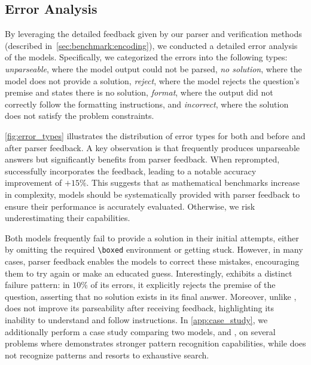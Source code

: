 
\subsection{Error Analysis} \label{sec:error_analysis}

By leveraging the detailed feedback given by our parser and verification methods (described in~\cref{sec:benchmark:encoding}), we conducted a detailed error analysis of the models. Specifically, we categorized the errors into the following types: \textit{unparseable}, where the model output could not be parsed, \textit{no solution}, where the model does not provide a solution, \textit{reject}, where the model rejects the question's premise and states there is no solution, \textit{format}, where the output did not correctly follow the formatting instructions, and \textit{incorrect}, where the solution does not satisfy the problem constraints. 

\cref{fig:error_types} illustrates the distribution of error types for both \othree{} and \qwq{} before and after parser feedback. A key observation is that \othree{} frequently produces unparseable answers but significantly benefits from parser feedback. When reprompted, \othree{} successfully incorporates the feedback, leading to a notable accuracy improvement of $+15\%$. This suggests that as mathematical benchmarks increase in complexity, models should be systematically provided with parser feedback to ensure their performance is accurately evaluated. Otherwise, we risk underestimating their capabilities. 

Both models frequently fail to provide a solution in their initial attempts, either by omitting the required \texttt{\textbackslash boxed} environment or getting stuck. However, in many cases, parser feedback enables the models to correct these mistakes, encouraging them to try again or make an educated guess.
Interestingly, \qwq{} exhibits a distinct failure pattern: in $10\%$ of its errors, it explicitly rejects the premise of the question, asserting that no solution exists in its final answer. Moreover, unlike \othree{}, \qwq{} does not improve its parseability after receiving feedback, highlighting its inability to understand and follow instructions.
In \cref{app:case_study}, we additionally perform a case study comparing two models, \oone{} and \geminithink{}, on several problems where \oone{} demonstrates stronger pattern recognition capabilities, while \geminithink{} does not recognize patterns and resorts to exhaustive search.

